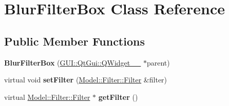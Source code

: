 \hypertarget{classGUI_1_1BlurFilterBox}{}\section{Blur\+Filter\+Box Class Reference}
\label{classGUI_1_1BlurFilterBox}
\subsection*{Public Member Functions}
\begin{DoxyCompactItemize}
\item 
\hypertarget{classGUI_1_1BlurFilterBox_aba79cae9264a810b41e13637f082d499}{}{\bfseries Blur\+Filter\+Box} (\hyperlink{classGUI_1_1QtGui_1_1QWidget____10}{G\+U\+I\+::\+Qt\+Gui\+::\+Q\+Widget\+\_\+\+\_} $\ast$parent)\label{classGUI_1_1BlurFilterBox_aba79cae9264a810b41e13637f082d499}

\item 
\hypertarget{classGUI_1_1BlurFilterBox_ad7c0ee00fe3faac7942d75eec2a5342b}{}virtual void {\bfseries set\+Filter} (\hyperlink{classModel_1_1Filter_1_1Filter}{Model\+::\+Filter\+::\+Filter} \&filter)\label{classGUI_1_1BlurFilterBox_ad7c0ee00fe3faac7942d75eec2a5342b}

\item 
\hypertarget{classGUI_1_1BlurFilterBox_acef2029a93f4ab3a538cdb643b9c2613}{}virtual \hyperlink{classModel_1_1Filter_1_1Filter}{Model\+::\+Filter\+::\+Filter} $\ast$ {\bfseries get\+Filter} ()\label{classGUI_1_1BlurFilterBox_acef2029a93f4ab3a538cdb643b9c2613}

\end{DoxyCompactItemize}
